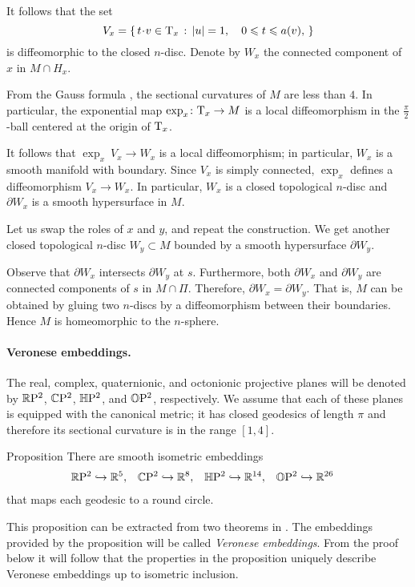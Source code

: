 \documentclass[a4paper,10pt]{article}
\begin{document}
It follows that the set 
\[V_x=\set{t\cdot v\in \T_x}{|u|=1,\quad 0\le t\le a(v),}\]
is diffeomorphic to the closed $n$-disc.
Denote by $W_x$ the connected component of $x$ in $M\cap H_x$.

From the Gauss formula \cite[Lemma 5]{petrunin2024}, the sectional curvatures of $M$ are less than $4$.
In particular, the exponential map $\exp_x\colon\mathrm{T}_x\to M$ is a local diffeomorphism in the $\tfrac\pi2$-ball centered at the origin of $\mathrm{T}_x$.

It follows that $\exp_x\:V_x\to W_x$ is a local diffeomorphism;
in particular, $W_x$ is a smooth manifold with boundary.
Since $V_x$ is simply connected, $\exp_x$ defines a diffeomorphism $V_x\to W_x$.
In particular, $W_x$ is a closed topological $n$-disc and $\partial W_x$ is a smooth hypersurface in $M$.

Let us swap the roles of $x$ and $y$, and repeat the construction.
We get another closed topological $n$-disc $W_y\subset M$ bounded by a smooth hypersurface $\partial W_y$.

Observe that $\partial W_x$ intersects $\partial W_y$ at $s$.
Furthermore, both $\partial W_x$ and $\partial W_y$ are connected components of $s$ in $M\cap \Pi$.
Therefore, $\partial W_x=\partial W_y$.
That is, $M$ can be obtained by gluing two $n$-discs by a diffeomorphism between their boundaries.
Hence $M$ is homeomorphic to the $n$-sphere.
\qeds

\paragraph{Veronese embeddings.}\label{thm:=}
The real, complex, quaternionic, and octonionic projective planes will be denoted by
$\mathbb{R}\mathrm{P}^2$, $\mathbb{C}\mathrm{P}^2$, $\mathbb{H}\mathrm{P}^2$, and $\mathbb{O}\mathrm{P}^2$, respectively.
We assume that each of these planes is equipped with the canonical metric;
it has closed geodesics of length $\pi$ and therefore its sectional curvature is in the range $[1,4]$.

\begin{thm}{Proposition}
There are smooth isometric embeddings
\begin{align*}
\mathbb{R}\mathrm{P}^2& \hookrightarrow\mathbb{R}^5 , 
&
\mathbb{C}\mathrm{P}^2& \hookrightarrow\mathbb{R}^8,
&
\mathbb{H}\mathrm{P}^2& \hookrightarrow\mathbb{R}^{14}, 
&
\mathbb{O}\mathrm{P}^2& \hookrightarrow\mathbb{R}^{26}
\end{align*}
that maps each geodesic to a round circle. 

\end{thm}

This proposition can be extracted from two theorems in \cite[§ 2]{sakamoto}.
The embeddings provided by the proposition will be called \emph{Veronese embeddings}.
From the proof below it will follow that the properties in the proposition uniquely describe
Veronese embeddings up to isometric inclusion.
\end{document}
